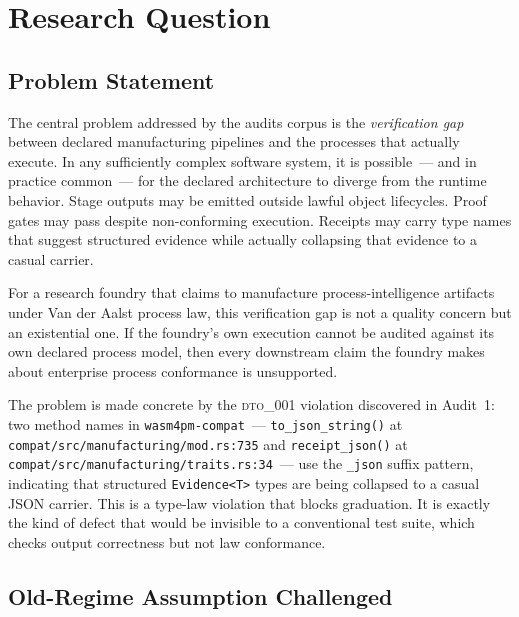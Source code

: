 
\section{Research Question}
\label{sec:audits-rq}

\subsection{Problem Statement}
\label{sec:audits-rq-problem}

The central problem addressed by the audits corpus is the \emph{verification gap}
between declared manufacturing pipelines and the processes that actually execute.
In any sufficiently complex software system, it is possible~--- and in practice
common~--- for the declared architecture to diverge from the runtime behavior.
Stage outputs may be emitted outside lawful object lifecycles. Proof gates may
pass despite non-conforming execution. Receipts may carry type names that suggest
structured evidence while actually collapsing that evidence to a casual carrier.

For a research foundry that claims to manufacture process-intelligence artifacts
under Van der Aalst process law, this verification gap is not a quality concern
but an existential one. If the foundry's own execution cannot be audited against
its own declared process model, then every downstream claim the foundry makes
about enterprise process conformance is unsupported.

The problem is made concrete by the \textsc{dto\_001} violation discovered in
Audit~1: two method names in \texttt{wasm4pm-compat}~--- \texttt{to\_json\_string()}
at \texttt{compat/src/manufacturing/mod.rs:735} and \texttt{receipt\_json()} at
\texttt{compat/src/manufacturing/traits.rs:34}~--- use the \texttt{\_json} suffix
pattern, indicating that structured \texttt{Evidence<T>} types are being collapsed
to a casual JSON carrier. This is a type-law violation that blocks graduation. It
is exactly the kind of defect that would be invisible to a conventional test suite,
which checks output correctness but not law conformance.

\subsection{Old-Regime Assumption Challenged}
\label{sec:audits-rq-old-regime}


